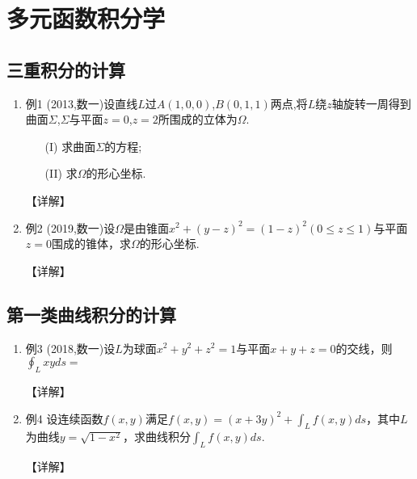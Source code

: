 \documentclass[12pt, a4paper, oneside, UTF8]{ctexbook}
\begin{document}

\else
\fi

\chapter{多元函数积分学}
\section{三重积分的计算}

\begin{enumerate}[label=\arabic*.]
    \item 例1 (2013,数一)设直线$L$过$A(1,0,0)$,$B(0,1,1)$两点,将$L$绕$z$轴旋转一周得到曲面$\Sigma$,$\Sigma$与平面$z=0$,$z=2$所围成的立体为$\Omega$.
    \begin{enumerate}
        \item[(I)] 求曲面$\Sigma$的方程;
        \item[(II)] 求$\Omega$的形心坐标.
    \end{enumerate}
    
    \begin{solution}
    【详解】
    \end{solution}
    
    \item 例2 (2019,数一)设$\Omega$是由锥面$x^{2}+(y-z)^{2}=(1-z)^{2}(0\leq z\leq 1)$与平面$z=0$围成的锥体，求$\Omega$的形心坐标.
    
    \begin{solution}
    【详解】
    \end{solution}
\end{enumerate}

\section{第一类曲线积分的计算}

\begin{enumerate}[label=\arabic*.,start=3]
    \item 例3 (2018,数一)设$L$为球面$x^2+y^2+z^2=1$与平面$x+y+z=0$的交线，则$\oint_L xy ds=$
    
    \begin{solution}
    【详解】
    \end{solution}
    
    \item 例4 设连续函数$f(x,y)$满足$f(x,y)=(x+3y)^2+\int_L f(x,y) ds$，其中$L$为曲线$y=\sqrt{1-x^2}$，求曲线积分$\int_L f(x,y) ds$.
    
    \begin{solution}
    【详解】
    \end{solution}
\end{enumerate}
\end{document}
